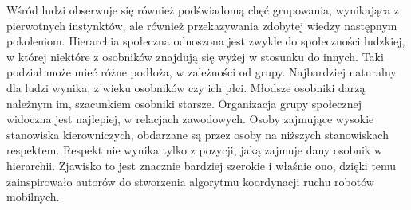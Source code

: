 \documentclass{beamer}
\begin{document}
\begin{frame}
{Wśród ludzi obserwuje się również podświadomą chęć grupowania, wynikająca z pierwotnych instynktów, ale również przekazywania zdobytej wiedzy następnym pokoleniom. Hierarchia społeczna odnoszona jest zwykle do społeczności ludzkiej, w której niektóre z osobników znajdują się wyżej w stosunku do innych. Taki podział może mieć różne podłoża, w zależności od grupy. Najbardziej naturalny dla ludzi wynika, z wieku osobników czy ich płci. Młodsze osobniki darzą należnym im, szacunkiem osobniki starsze. Organizacja grupy społecznej widoczna jest najlepiej, w relacjach zawodowych. Osoby zajmujące wysokie stanowiska kierowniczych, obdarzane są przez osoby na niższych stanowiskach respektem. Respekt nie wynika tylko z pozycji, jaką zajmuje dany osobnik w hierarchii. Zjawisko to jest znacznie bardziej szerokie i właśnie ono, dzięki temu zainspirowało autorów do stworzenia algorytmu koordynacji ruchu robotów mobilnych.}

\end{frame}
\end{document}
